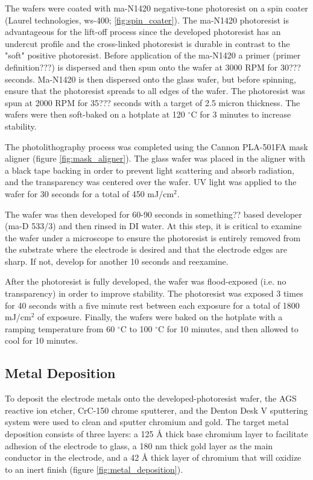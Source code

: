 \par The wafers were coated with ma-N1420 negative-tone photoresist on a spin coater (Laurel technologies, ws-400; \ref{fig:spin_coater}). The ma-N1420 photoresist is advantageous for the lift-off process since the developed photoresist has an undercut profile and the cross-linked photoresist is durable in contrast to the "soft" positive photoresist. Before application of the ma-N1420 a primer (primer definition???) is dispersed and then spun onto the wafer at 3000 RPM for 30??? seconds. Ma-N1420 is then dispersed onto the glass wafer, but before spinning, ensure that the photoresist spreads to all edges of the wafer. The photoresist was spun at 2000 RPM for 35??? seconds with a target of 2.5 micron thickness. The wafers were then soft-baked on a hotplate at 120 $^\circ$C for 3 minutes to increase stability. 

\par The photolithography process was completed using the Cannon PLA-501FA mask aligner (figure \ref{fig:mask_aligner}). The glass wafer was placed in the aligner with a black tape backing in order to prevent light scattering and absorb radiation, and the transparency was centered over the wafer. UV light was applied to the wafer for 30 seconds for a total of 450 mJ/cm$^2$. 

\par The wafer was then developed for 60-90 seconds in something?? based developer (ma-D 533/3) and then rinsed in DI water. At this step, it is critical to examine the wafer under a microscope to ensure the photoresist is entirely removed from the substrate where the electrode is desired and that the electrode edges are sharp. If not, develop for another 10 seconds and reexamine. 

\par After the photoresist is fully developed, the wafer was flood-exposed (i.e. no transparency) in order to improve stability. The photoresist was exposed 3 times for 40 seconds with a five minute rest between each exposure for a total of 1800 mJ/cm$^2$ of exposure. Finally, the wafers were baked on the hotplate with a ramping temperature from 60 $^\circ$C to 100 $^\circ$C for 10 minutes, and then allowed to cool for 10 minutes. 

\subsection*{Metal Deposition}

\par To deposit the electrode metals onto the developed-photoresist wafer, the AGS reactive ion etcher, CrC-150 chrome sputterer, and the Denton Desk V sputtering system were used to clean and sputter chromium and gold. The target metal deposition consists of three layers: a 125 \si{\angstrom} thick base chromium layer to facilitate adhesion of the electrode to glass, a 180 nm thick gold layer as the main conductor in the electrode, and a 42 \si{\angstrom} thick layer of chromium that will oxidize to an inert finish (figure \ref{fig:metal_deposition}).

